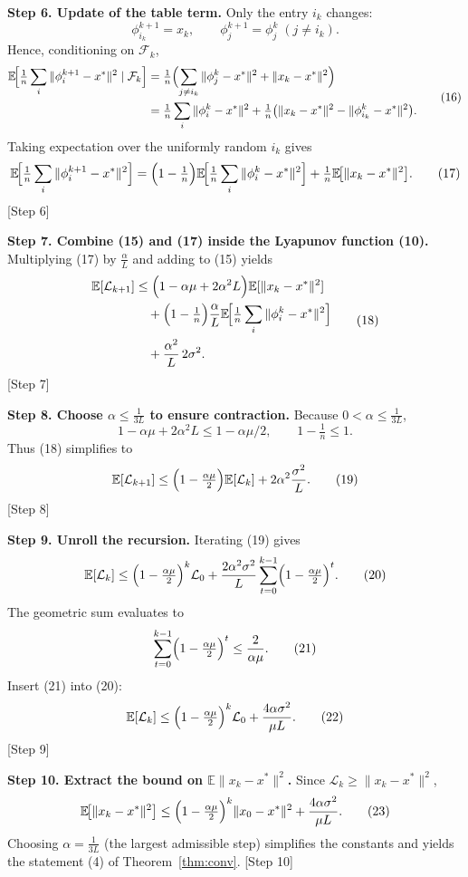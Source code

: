 \documentclass[11pt]{article}
\newcommand{\E}{\mathbb{E}}
\begin{document}
\noindent\textbf{Step 6. Update of the table term.}
Only the entry $i_{k}$ changes:
\[
\phi^{k+1}_{i_{k}}=x_{k},\qquad
\phi^{k+1}_{j}=\phi^{k}_{j}\;(j\neq i_{k}).
\]
Hence, conditioning on $\mathcal{F}_{k}$,
\[
\begin{aligned}
\E\!\Bigl[\tfrac1n\sum_{i}\|\phi^{k+1}_{i}-x^{*}\|^{2}\mid\mathcal{F}_{k}\Bigr]
&=\tfrac1n\Bigl(\sum_{j\neq i_{k}}\|\phi^{k}_{j}-x^{*}\|^{2}
+\|x_{k}-x^{*}\|^{2}\Bigr)\\
&=\tfrac1n\sum_{i}\|\phi^{k}_{i}-x^{*}\|^{2}
+\tfrac1n\bigl(\|x_{k}-x^{*}\|^{2}
-\|\phi^{k}_{i_{k}}-x^{*}\|^{2}\bigr).
\end{aligned}
\tag{16}
\]
Taking expectation over the uniformly random $i_{k}$ gives
\[
\E\!\Bigl[\tfrac1n\sum_{i}\|\phi^{k+1}_{i}-x^{*}\|^{2}\Bigr]
=
\Bigl(1-\tfrac1n\Bigr)\E\!\Bigl[\tfrac1n\sum_{i}\|\phi^{k}_{i}-x^{*}\|^{2}\Bigr]
+\tfrac1n\E\!\bigl[\|x_{k}-x^{*}\|^{2}\bigr].
\tag{17}
\]
[Step 6]

\noindent\textbf{Step 7. Combine (15) and (17) inside the Lyapunov function (10).}
Multiplying (17) by $\frac{\alpha}{L}$ and adding to (15) yields
\[
\begin{aligned}
\E[\mathcal{L}_{k+1}]
&\le \Bigl(1-\alpha\mu+2\alpha^{2}L\Bigr)\E[\|x_{k}-x^{*}\|^{2}]
\\
&\quad +\Bigl(1-\tfrac1n\Bigr)\frac{\alpha}{L}
\E\!\Bigl[\tfrac1n\sum_{i}\|\phi^{k}_{i}-x^{*}\|^{2}\Bigr]  \\
&\quad +\frac{\alpha^{2}}{L}\,2\sigma^{2}.
\end{aligned}
\tag{18}
\]
[Step 7]

\noindent\textbf{Step 8. Choose $\alpha\le\frac{1}{3L}$ to ensure contraction.}
Because $0<\alpha\le\frac{1}{3L}$,
\[
1-\alpha\mu+2\alpha^{2}L \le 1-\alpha\mu/2,
\qquad
1-\tfrac1n \le 1.
\]
Thus (18) simplifies to
\[
\E[\mathcal{L}_{k+1}]
\le \Bigl(1-\tfrac{\alpha\mu}{2}\Bigr)\E[\mathcal{L}_{k}]
+2\alpha^{2}\frac{\sigma^{2}}{L}.
\tag{19}
\]
[Step 8]

\noindent\textbf{Step 9. Unroll the recursion.}
Iterating (19) gives
\[
\E[\mathcal{L}_{k}]
\le \Bigl(1-\tfrac{\alpha\mu}{2}\Bigr)^{k}\mathcal{L}_{0}
+\frac{2\alpha^{2}\sigma^{2}}{L}\sum_{t=0}^{k-1}
\Bigl(1-\tfrac{\alpha\mu}{2}\Bigr)^{t}.
\tag{20}
\]
The geometric sum evaluates to
\[
\sum_{t=0}^{k-1}\Bigl(1-\tfrac{\alpha\mu}{2}\Bigr)^{t}
\le \frac{2}{\alpha\mu}.
\tag{21}
\]
Insert (21) into (20):
\[
\E[\mathcal{L}_{k}]
\le \Bigl(1-\tfrac{\alpha\mu}{2}\Bigr)^{k}\mathcal{L}_{0}
+\frac{4\alpha\sigma^{2}}{\mu L}.
\tag{22}
\]
[Step 9]

\noindent\textbf{Step 10. Extract the bound on $\E\|x_{k}-x^{*}\|^{2}$.}
Since $\mathcal{L}_{k}\ge\|x_{k}-x^{*}\|^{2}$,
\[
\E\!\bigl[\|x_{k}-x^{*}\|^{2}\bigr]
\le \Bigl(1-\tfrac{\alpha\mu}{2}\Bigr)^{k}\|x_{0}-x^{*}\|^{2}
+\frac{4\alpha\sigma^{2}}{\mu L}.
\tag{23}
\]
Choosing $\alpha=\frac{1}{3L}$ (the largest admissible step) simplifies the constants and yields the statement (4) of Theorem~\ref{thm:conv}.
[Step 10]
\end{document}
